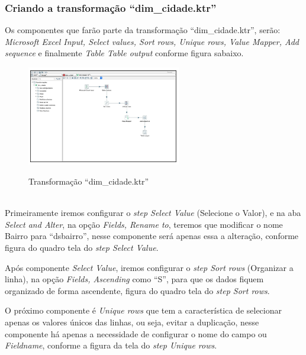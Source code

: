 \subsubsection{Criando a transforma\c{c}\~{a}o ``dim\_cidade.ktr''}

Os componentes que far\~{a}o parte da transforma\c{c}\~{a}o ``dim\_cidade.ktr'', ser\~{a}o: \textit{Microsoft Excel Input, Select values, Sort rows, Unique rows, Value Mapper, Add sequence} e finalmente \textit{Table Table output} conforme figura sabaixo. 

\begin{figure}[H]
	\vspace*{0,2cm}
    \centering
    \caption{Transforma\c{c}\~{a}o ``dim\_cidade.ktr''}
    \includegraphics[width=0.6\textwidth]{./04-figuras/figura-trans-dim-cidade}
    \label{fig:ilustfigtransdimcidade}
\end{figure}
\vspace*{-0,9cm}
{\raggedright {}} \\

Primeiramente iremos configurar o \textit{step Select Value} (Selecione o Valor), e na aba \textit{Select and Alter}, na op\c{c}\~{a}o \textit{Fields, Rename to}, teremos que modificar o nome Bairro para ``ds\-bairro'', nesse componente ser\'{a} apenas essa a altera\c{c}\~{a}o, conforme figura do quadro tela do \textit{step Select Value}.

Ap\'os  componente \textit{Select Value}, iremos configurar o \textit{step Sort rows} (Organizar a linha), na op\c{c}\~{a}o \textit{Fields, Ascending} como ``S'', para que os dados fiquem organizado de forma ascendente, figura do quadro tela do \textit{step Sort rows}.

O pr\'oximo componente \'{e} \textit{Unique rows} que tem a caracter\'{i}stica de selecionar apenas os valores únicos das linhas, ou seja, evitar a duplica\c{c}\~{a}o, nesse componente h\'{a} apenas a necessidade de configurar o nome do campo ou \textit{Fieldname}, conforme a figura da tela do \textit{step Unique rows}.

